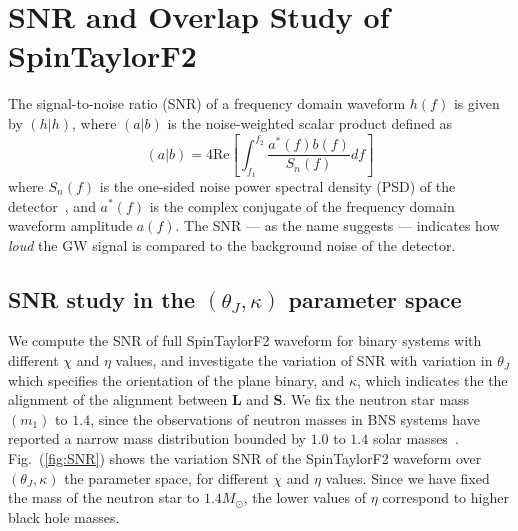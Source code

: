 
\chapter{SNR and Overlap Study of SpinTaylorF2}

The signal-to-noise ratio (SNR) of a frequency domain waveform $h(f)$ is given by 
$(h|h)$, where $(a|b)$ is the noise-weighted scalar product defined as 
\label{inner_product}  
\begin{equation} (a|b) = 4 \text{Re} \left[
\int_{f_{1}}^{f_{2}}  \dfrac{a^{*}(f)b(f)}{S_{n}(f)} df\right] 
\end{equation}
where $S_{n}(f)$ is the one-sided noise power spectral density (PSD) of the
detector~\cite{PSD}, and $a^{*}(f)$ is the complex conjugate of the frequency
domain waveform amplitude $a(f)$. The SNR --- as the name suggests --- indicates
how \textit{loud} the GW signal is compared to the background noise of the
detector. 

\section{SNR study in the $(\theta_J, \kappa)$ parameter space}
We compute the SNR of full SpinTaylorF2 waveform for binary systems
with  different $\chi$ and $\eta$ values, and investigate the variation of SNR
with variation in $\theta_{J}$ which specifies the orientation of the plane
binary, and $\kappa$, which indicates the the alignment of the alignment between
$\mathbf{L}$ and $\mathbf{S}$. We fix the neutron star mass $(m_{1})$ to $1.4$,
since the observations of neutron masses in BNS systems have reported a narrow
mass distribution bounded by $1.0$ to $1.4$ solar masses~\cite{Lorimer}.
Fig.~(\ref{fig:SNR}) shows the variation SNR of the SpinTaylorF2 waveform   over
$(\theta_J, \kappa)$ the parameter space, for different $\chi$ and $\eta$
values. Since we have fixed the mass of the neutron star to $1.4 M_{\odot}$, the
lower values of $\eta$ correspond to higher black hole masses.

